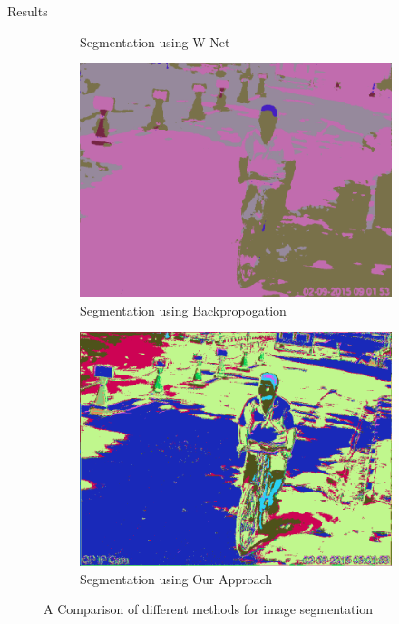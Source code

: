 \documentclass{article}
\begin{document}
\begin{ssection}{Results}
\begin{figure}[htpb]
\begin{subfigure}[b]{0.4\textwidth}
			\caption{Segmentation using W-Net}
		\end{subfigure}
		\begin{subfigure}[b]{0.4\textwidth}
		 	\centering
			\includegraphics[width=\textwidth]{includes/backprop.png}
			\caption{Segmentation using Backpropogation}
		\end{subfigure}
		\begin{subfigure}[b]{0.4\textwidth}
		 	\centering
			\includegraphics[width=\textwidth]{includes/ae-backprop.png}
			\caption{Segmentation using Our Approach}
		\end{subfigure}
		\caption{A Comparison of different methods for image segmentation}
		\label{fig:comparison}
	\end{figure}


\end{ssection}
\end{document}
